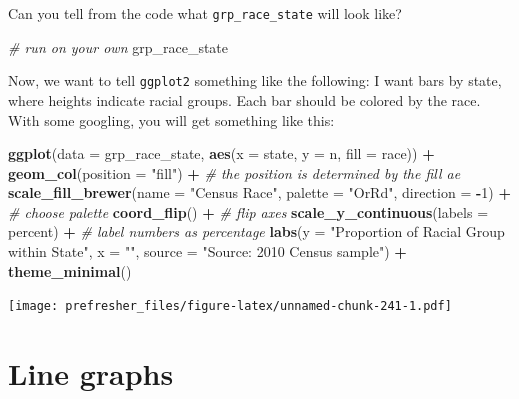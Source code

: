 \documentclass[]{book}
\newenvironment{Shaded}{\begin{snugshade}}{\end{snugshade}}
\newcommand{\KeywordTok}[1]{\textcolor[rgb]{0.13,0.29,0.53}{\textbf{#1}}}
\newcommand{\DataTypeTok}[1]{\textcolor[rgb]{0.13,0.29,0.53}{#1}}
\newcommand{\DecValTok}[1]{\textcolor[rgb]{0.00,0.00,0.81}{#1}}
\newcommand{\StringTok}[1]{\textcolor[rgb]{0.31,0.60,0.02}{#1}}
\newcommand{\CommentTok}[1]{\textcolor[rgb]{0.56,0.35,0.01}{\textit{#1}}}
\newcommand{\OperatorTok}[1]{\textcolor[rgb]{0.81,0.36,0.00}{\textbf{#1}}}
\newcommand{\NormalTok}[1]{#1}
\theoremstyle{definition}
\theoremstyle{definition}
\theoremstyle{definition}
\theoremstyle{remark}
\begin{document}
Can you tell from the code what \texttt{grp\_race\_state} will look
like?

\begin{Shaded}
\begin{Highlighting}[]
\CommentTok{# run on your own}
\NormalTok{grp_race_state}
\end{Highlighting}
\end{Shaded}

Now, we want to tell \texttt{ggplot2} something like the following: I
want bars by state, where heights indicate racial groups. Each bar
should be colored by the race. With some googling, you will get
something like this:

\begin{Shaded}
\begin{Highlighting}[]
\KeywordTok{ggplot}\NormalTok{(}\DataTypeTok{data =}\NormalTok{ grp_race_state, }\KeywordTok{aes}\NormalTok{(}\DataTypeTok{x =}\NormalTok{  state, }\DataTypeTok{y =}\NormalTok{ n,  }\DataTypeTok{fill =}\NormalTok{ race)) }\OperatorTok{+}
\StringTok{  }\KeywordTok{geom_col}\NormalTok{(}\DataTypeTok{position =} \StringTok{"fill"}\NormalTok{) }\OperatorTok{+}\StringTok{ }\CommentTok{# the position is determined by the fill ae}
\StringTok{  }\KeywordTok{scale_fill_brewer}\NormalTok{(}\DataTypeTok{name =} \StringTok{"Census Race"}\NormalTok{, }\DataTypeTok{palette =} \StringTok{"OrRd"}\NormalTok{, }\DataTypeTok{direction =} \OperatorTok{-}\DecValTok{1}\NormalTok{) }\OperatorTok{+}\StringTok{ }\CommentTok{# choose palette}
\StringTok{  }\KeywordTok{coord_flip}\NormalTok{() }\OperatorTok{+}\StringTok{ }\CommentTok{# flip axes}
\StringTok{  }\KeywordTok{scale_y_continuous}\NormalTok{(}\DataTypeTok{labels =}\NormalTok{ percent) }\OperatorTok{+}\StringTok{ }\CommentTok{# label numbers as percentage}
\StringTok{  }\KeywordTok{labs}\NormalTok{(}\DataTypeTok{y =} \StringTok{"Proportion of Racial Group within State"}\NormalTok{,}
       \DataTypeTok{x =} \StringTok{""}\NormalTok{,}
       \DataTypeTok{source =} \StringTok{"Source: 2010 Census  sample"}\NormalTok{) }\OperatorTok{+}
\StringTok{  }\KeywordTok{theme_minimal}\NormalTok{()}
\end{Highlighting}
\end{Shaded}

\texttt{[image: prefresher\_files/figure-latex/unnamed-chunk-241-1.pdf]}

\section{Line graphs}\label{line-graphs}
\end{document}
